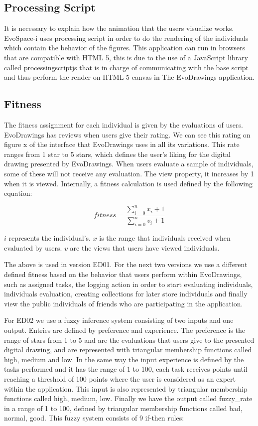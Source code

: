 \subsection{Processing Script}
It is necessary to explain how the animation
that the users visualize works. EvoSpace-i uses processing script in order to do
the rendering of the individuals which contain the behavior of the figures. This
application can run in browsers that are compatible with HTML 5, this is due to
the use of a JavaScript library called processingscriptjs that is in charge of
communicating with the base script and thus perform the render on HTML 5 canvas
in The EvoDrawings application.

\subsection{Fitness}
The fitness assignment for each individual is given by the
evaluations of users. EvoDrawings has reviews when users give their
rating. We can see this rating on figure x of the %
interface that EvoDrawings uses in all its variations. This rate ranges from 1
star to 5 stars, which defines the user's liking for the digital drawing
presented by EvoDrawings. When users evaluate a sample of individuals, some of
these will not receive any evaluation. The view property, it increases by 1 when
it is viewed. Internally, a fitness calculation is used defined by the following
equation:

\begin{equation}\label{eq:fitfunc01}
\displaystyle fitness=\frac{\sum_{i=0}^{n}x_{i}+ 1}{\sum_{i=0}^{n}v_{i} + 1}
\end{equation}

$i$ represents the individual's.
$x$ is the range that individuals received when evaluated by users.
$v$ are the views that users have viewed individuals.

The above is used in version ED01. For the next two versions we use a different
defined fitness based on the behavior that users perform within EvoDrawings,
such as assigned tasks, the logging action in order to start evaluating
individuals, individuals evaluation, creating collections for later store
individuals and finally view the public individuals of friends who are
participating in the application.

For ED02 we use a fuzzy inference system consisting of two inputs and one
output. Entries are defined by preference and experience. The preference is the
range of stars from 1 to 5 and are the evaluations that users give to the
presented digital drawing, and are represented with triangular membership
functions called high, medium and low. In the same way the input experience is
defined by the tasks performed and it has the range of 1 to 100, each task
receives points until reaching a threshold of 100 points where the user is
considered as an expert within the application. This input is also represented
by triangular membership functions called high, medium, low. Finally we have the
output called fuzzy\_rate in a range of 1 to 100, defined by triangular
membership functions called bad, normal, good. This fuzzy system consists of 9
if-then rules:

